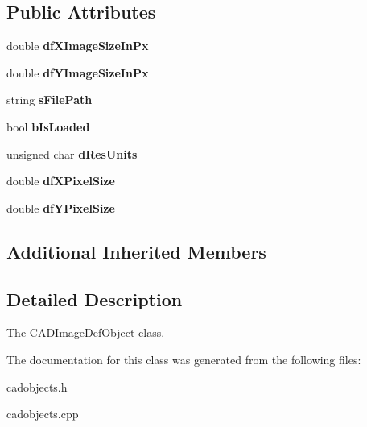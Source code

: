 \subsection*{Public Attributes}
\begin{DoxyCompactItemize}
\item 
double {\bfseries df\+X\+Image\+Size\+In\+Px}\hypertarget{class_c_a_d_image_def_object_ad2e39e446e37152ebf60fb1e8ad97fe2}{}\label{class_c_a_d_image_def_object_ad2e39e446e37152ebf60fb1e8ad97fe2}

\item 
double {\bfseries df\+Y\+Image\+Size\+In\+Px}\hypertarget{class_c_a_d_image_def_object_a0c6669b0799ca8a4e8249917dcb9724c}{}\label{class_c_a_d_image_def_object_a0c6669b0799ca8a4e8249917dcb9724c}

\item 
string {\bfseries s\+File\+Path}\hypertarget{class_c_a_d_image_def_object_a088debaa7a45fe9347d9a2490d7d7021}{}\label{class_c_a_d_image_def_object_a088debaa7a45fe9347d9a2490d7d7021}

\item 
bool {\bfseries b\+Is\+Loaded}\hypertarget{class_c_a_d_image_def_object_a6753acf3bc670a2990fd540885e79097}{}\label{class_c_a_d_image_def_object_a6753acf3bc670a2990fd540885e79097}

\item 
unsigned char {\bfseries d\+Res\+Units}\hypertarget{class_c_a_d_image_def_object_aa8d71f2c8d4ae62d7196d8e44c658995}{}\label{class_c_a_d_image_def_object_aa8d71f2c8d4ae62d7196d8e44c658995}

\item 
double {\bfseries df\+X\+Pixel\+Size}\hypertarget{class_c_a_d_image_def_object_aad8ae5aa83ac9b4d71ddb0551a1a98c2}{}\label{class_c_a_d_image_def_object_aad8ae5aa83ac9b4d71ddb0551a1a98c2}

\item 
double {\bfseries df\+Y\+Pixel\+Size}\hypertarget{class_c_a_d_image_def_object_aeed242209d59504dc5733a2df734104c}{}\label{class_c_a_d_image_def_object_aeed242209d59504dc5733a2df734104c}

\end{DoxyCompactItemize}
\subsection*{Additional Inherited Members}


\subsection{Detailed Description}
The \hyperlink{class_c_a_d_image_def_object}{C\+A\+D\+Image\+Def\+Object} class. 

The documentation for this class was generated from the following files\+:\begin{DoxyCompactItemize}
\item 
cadobjects.\+h\item 
cadobjects.\+cpp\end{DoxyCompactItemize}
